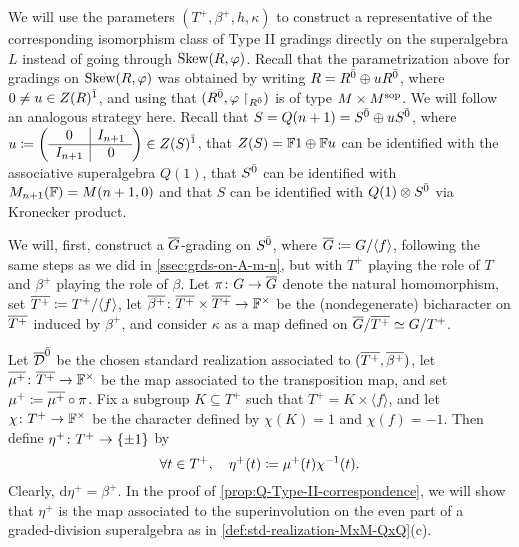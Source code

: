 We will use the parameters $(T^+, \beta^+, h, \kappa)$ to construct a representative of the corresponding isomorphism class of Type II gradings directly on the superalgebra $L$ instead of going through $\operatorname{Skew}(R, \varphi)$. 
Recall that the parametrization above for gradings on $\operatorname{Skew}(R, \varphi)$ was obtained by writing $R = R^{\bar0} \oplus u R^{\bar0}$, where $0 \neq u \in Z(R)^{\bar1}$, and using that $(R^{\bar0}, \varphi\restriction_{R^{\bar0}})$ is of type $M\times M^{\mathrm{sop}}$.  
We will follow an analogous strategy here. 
Recall that $S = Q(n+1) = S^{\bar0} \oplus u S^{\bar0}$, where
$ 
    u \coloneqq
    \left(\begin{array}{c|c}
        0 & I_{n+1}\\
        \hline
        I_{n+1} & 0\\
    \end{array}\right)
    \in Z(S)^{\bar1}
$,
that $Z(S) = \mathbb{F}1 \oplus \mathbb{F} u$ can be identified with the associative superalgebra $Q(1)$, that $S^{\bar0}$ can be identified with $M_{n+1}(\mathbb{F}) = M(n+1, 0)$ and that $S$ can be identified with $Q(1)\otimes S^{\bar0}$ via Kronecker product. 

We will, first, construct a $\barr G$-grading on $S^{\bar0}$, where $\barr G \coloneqq G/\langle f \rangle$, following the same steps as we did in \cref{ssec:grds-on-A-m-n}, but with $T^+$ playing the role of $T$ and $\beta^+$ playing the role of $\beta$. 
Let $\pi\from G \to \barr G$ denote the natural homomorphism, set $\barr {T^+} \coloneqq T^+/\langle f \rangle$, let $\barr {\beta^+}\from \barr {T^+} \times \barr {T^+} \to \FF^\times$ be the (nondegenerate) bicharacter on $\barr {T^+}$ induced by $\beta^+$, and consider $\kappa$ as a map defined on $\barr G/\barr {T^+} \iso G/{T^+}$.

Let $\barr \D\even$ be the chosen standard realization associated to $(\barr{T^+}, \barr{\beta^+})$, let $\barr {\mu^+}\from \barr{T^+} \to \FF^\times$ be the map associated to the transposition map, and set $\mu^+ \coloneqq \barr {\mu^+} \circ \pi$. 
Fix a subgroup $K \subseteq T^+$ such that $T^+ = K \times \langle f \rangle$, and let $\chi\colon T^+ \to \mathbb{F}^\times$ be the character defined by $\chi(K) = 1$ and $\chi(f) = -1$. 
Then define $\eta^+\colon T^+ \to \{ \pm 1 \}$ by
\[\label{eq:fix-eta-plus-undouble-Q}
    \forall t\in T^+, \quad \eta^+(t) \coloneqq \mu^+(t) \chi^{-1}(t).
\] 
Clearly, $\mathrm{d} \eta^+ = \beta^+$. 
In the proof of \cref{prop:Q-Type-II-correspondence}, we will show that $\eta^+$ is the map associated to the superinvolution on the even part of a graded-division superalgebra as in \cref{def:std-realization-MxM-QxQ}(c). 

